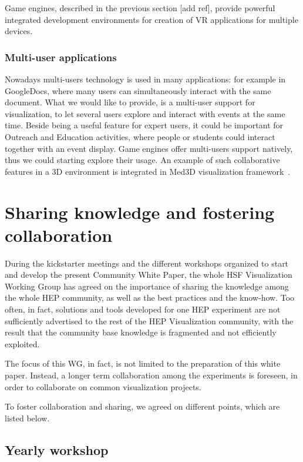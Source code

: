 \documentclass[12pt,a4paper]{article}
\begin{document}
Game engines, described in the previous section [add ref],  provide powerful integrated development environments for creation
of VR applications for multiple devices.

\hypertarget{multi-user}{%
\subsubsection{Multi-user applications}\label{multi-user}}

Nowadays multi-users technology is used in many applications: for example in GoogleDocs, where many users can simultaneously
interact with the same document. What we would like to provide, is a multi-user support for visualization, to let several users
explore and interact with events at the same time. Beside being a useful feature for expert users, it could be important for
Outreach and Education activities, where people or students could interact together with an event display.
Game engines offer multi-users support natively, thus we could starting explore their usage.
An example of such collaborative features in a 3D environment is integrated in Med3D visualization framework~\cite{Bohak2017}.

\hypertarget{sharing-knowledge}{%
\section{Sharing knowledge and fostering collaboration}\label{sharing-knowledge}}

During the kickstarter meetings and the different workshops organized to start and develop the present Community White Paper,
the whole HSF Visualization Working Group has agreed on the importance of sharing the knowledge among the whole HEP community,
as well as the best practices and the know-how. Too often, in fact, solutions and tools developed for one HEP experiment are
not sufficiently advertised to the rest of the HEP Visualization community, with the result that the community base knowledge
is fragmented and not efficiently exploited.

The focus of this WG, in fact, is not limited to the preparation of this white paper. Instead, a longer term collaboration
among the experiments is foreseen, in order to collaborate on common visualization projects.

To foster collaboration and sharing, we agreed on different points, which are listed below.

\hypertarget{workshop}{%
\subsection{Yearly workshop}\label{workshop}}
\end{document}
